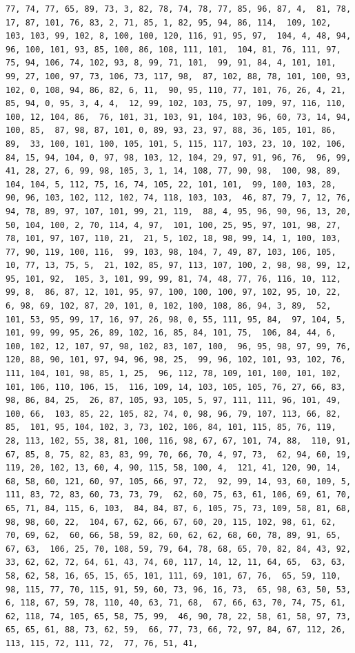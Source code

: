 \documentclass[
]{article}
\begin{document}
\begin{verbatim}
77, 74, 77, 65, 89, 73, 3, 82, 78, 74, 78, 77, 85, 96, 87, 4,  81, 78, 17, 87, 101, 76, 83, 2, 71, 85, 1, 82, 95, 94, 86, 114,  109, 102, 103, 103, 99, 102, 8, 100, 100, 120, 116, 91, 95, 97,  104, 4, 48, 94, 96, 100, 101, 93, 85, 100, 86, 108, 111, 101,  104, 81, 76, 111, 97, 75, 94, 106, 74, 102, 93, 8, 99, 71, 101,  99, 91, 84, 4, 101, 101, 99, 27, 100, 97, 73, 106, 73, 117, 98,  87, 102, 88, 78, 101, 100, 93, 102, 0, 108, 94, 86, 82, 6, 11,  90, 95, 110, 77, 101, 76, 26, 4, 21, 85, 94, 0, 95, 3, 4, 4,  12, 99, 102, 103, 75, 97, 109, 97, 116, 110, 100, 12, 104, 86,  76, 101, 31, 103, 91, 104, 103, 96, 60, 73, 14, 94, 100, 85,  87, 98, 87, 101, 0, 89, 93, 23, 97, 88, 36, 105, 101, 86, 89,  33, 100, 101, 100, 105, 101, 5, 115, 117, 103, 23, 10, 102, 106,  84, 15, 94, 104, 0, 97, 98, 103, 12, 104, 29, 97, 91, 96, 76,  96, 99, 41, 28, 27, 6, 99, 98, 105, 3, 1, 14, 108, 77, 90, 98,  100, 98, 89, 104, 104, 5, 112, 75, 16, 74, 105, 22, 101, 101,  99, 100, 103, 28, 90, 96, 103, 102, 112, 102, 74, 118, 103, 103,  46, 87, 79, 7, 12, 76, 94, 78, 89, 97, 107, 101, 99, 21, 119,  88, 4, 95, 96, 90, 96, 13, 20, 50, 104, 100, 2, 70, 114, 4, 97,  101, 100, 25, 95, 97, 101, 98, 27, 78, 101, 97, 107, 110, 21,  21, 5, 102, 18, 98, 99, 14, 1, 100, 103, 77, 90, 119, 100, 116,  99, 103, 98, 104, 7, 49, 87, 103, 106, 105, 10, 77, 13, 75, 5,  21, 102, 85, 97, 113, 107, 100, 2, 98, 98, 99, 12, 95, 101, 92,  105, 3, 101, 99, 99, 81, 74, 48, 77, 76, 116, 10, 112, 99, 8,  86, 87, 12, 101, 95, 97, 100, 100, 100, 97, 102, 95, 10, 22,  6, 98, 69, 102, 87, 20, 101, 0, 102, 100, 108, 86, 94, 3, 89,  52, 101, 53, 95, 99, 17, 16, 97, 26, 98, 0, 55, 111, 95, 84,  97, 104, 5, 101, 99, 99, 95, 26, 89, 102, 16, 85, 84, 101, 75,  106, 84, 44, 6, 100, 102, 12, 107, 97, 98, 102, 83, 107, 100,  96, 95, 98, 97, 99, 76, 120, 88, 90, 101, 97, 94, 96, 98, 25,  99, 96, 102, 101, 93, 102, 76, 111, 104, 101, 98, 85, 1, 25,  96, 112, 78, 109, 101, 100, 101, 102, 101, 106, 110, 106, 15,  116, 109, 14, 103, 105, 105, 76, 27, 66, 83, 98, 86, 84, 25,  26, 87, 105, 93, 105, 5, 97, 111, 111, 96, 101, 49, 100, 66,  103, 85, 22, 105, 82, 74, 0, 98, 96, 79, 107, 113, 66, 82, 85,  101, 95, 104, 102, 3, 73, 102, 106, 84, 101, 115, 85, 76, 119,  28, 113, 102, 55, 38, 81, 100, 116, 98, 67, 67, 101, 74, 88,  110, 91, 67, 85, 8, 75, 82, 83, 83, 99, 70, 66, 70, 4, 97, 73,  62, 94, 60, 19, 119, 20, 102, 13, 60, 4, 90, 115, 58, 100, 4,  121, 41, 120, 90, 14, 68, 58, 60, 121, 60, 97, 105, 66, 97, 72,  92, 99, 14, 93, 60, 109, 5, 111, 83, 72, 83, 60, 73, 73, 79,  62, 60, 75, 63, 61, 106, 69, 61, 70, 65, 71, 84, 115, 6, 103,  84, 84, 87, 6, 105, 75, 73, 109, 58, 81, 68, 98, 98, 60, 22,  104, 67, 62, 66, 67, 60, 20, 115, 102, 98, 61, 62, 70, 69, 62,  60, 66, 58, 59, 82, 60, 62, 62, 68, 60, 78, 89, 91, 65, 67, 63,  106, 25, 70, 108, 59, 79, 64, 78, 68, 65, 70, 82, 84, 43, 92,  33, 62, 62, 72, 64, 61, 43, 74, 60, 117, 14, 12, 11, 64, 65,  63, 63, 58, 62, 58, 16, 65, 15, 65, 101, 111, 69, 101, 67, 76,  65, 59, 110, 98, 115, 77, 70, 115, 91, 59, 60, 73, 96, 16, 73,  65, 98, 63, 50, 53, 6, 118, 67, 59, 78, 110, 40, 63, 71, 68,  67, 66, 63, 70, 74, 75, 61, 62, 118, 74, 105, 65, 58, 75, 99,  46, 90, 78, 22, 58, 61, 58, 97, 73, 65, 65, 61, 88, 73, 62, 59,  66, 77, 73, 66, 72, 97, 84, 67, 112, 26, 113, 115, 72, 111, 72,  77, 76, 51, 41, 
\end{verbatim}
\end{document}

